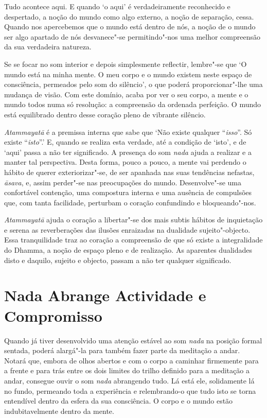 Tudo acontece aqui. E quando `o aqui' é verdadeiramente reconhecido e
despertado, a noção do mundo como algo externo, a noção de separação,
cessa. Quando nos apercebemos que o mundo está dentro de nós, a noção de
o mundo ser algo apartado de nós desvanece"-se permitindo"-nos uma melhor
compreensão da sua verdadeira natureza.

Se se focar no som interior e depois simplesmente reflectir, lembre"-se
que `O mundo está na minha mente. O meu corpo e o mundo existem neste
espaço de consciência, permeados pelo som do silêncio', o que poderá
proporcionar"-lhe uma mudança de visão. Com este domínio, acaba por ver o
seu corpo, a mente e o mundo todos numa só resolução: a compreensão da
ordenada perfeição. O mundo está equilibrado dentro desse coração pleno
de vibrante silêncio.

\emph{Atammayatā} é a premissa interna que sabe que `Não existe qualquer
``\emph{isso}''. Só existe ``\emph{isto}''.' E, quando se realiza esta
verdade, até a condição de `isto', e de `aqui' passa a não ter
significado. A presença do som \emph{nada} ajuda a realizar e a manter
tal perspectiva. Desta forma, pouco a pouco, a mente vai perdendo o
hábito de querer exteriorizar"-se, de ser apanhada nas suas tendências
nefastas, \emph{āsava}, e, assim perder"-se nas preocupações do mundo.
Desenvolve"-se uma confortável contenção, uma compostura interna e uma
ausência de compulsões que, com tanta facilidade, perturbam o coração
confundindo e bloqueando"-nos.

\emph{Atammayatā} ajuda o coração a libertar"-se dos mais subtis hábitos
de inquietação e serena as reverberações das ilusões enraizadas na
dualidade sujeito"-objecto. Essa tranquilidade traz ao coração a
compreensão de que só existe a integralidade do Dhamma, a noção de
espaço pleno e de realização. As aparentes dualidades disto e daquilo,
sujeito e objecto, passam a não ter qualquer significado.

\section{Nada Abrange Actividade e Compromisso}

Quando já tiver desenvolvido uma atenção estável ao som \emph{nada} na
posição formal sentada, poderá alargá"-la para também fazer parte da
meditação a andar. Notará que, embora de olhos abertos e com o corpo a
caminhar firmemente para a frente e para trás entre os dois limites do
trilho definido para a meditação a andar, consegue ouvir o som
\emph{nada} abrangendo tudo. Lá está ele, solidamente lá no fundo,
permeando toda a experiência e relembrando-o que tudo isto se torna
entendível dentro da esfera da sua consciência. O corpo e o mundo estão
indubitavelmente dentro da mente.

